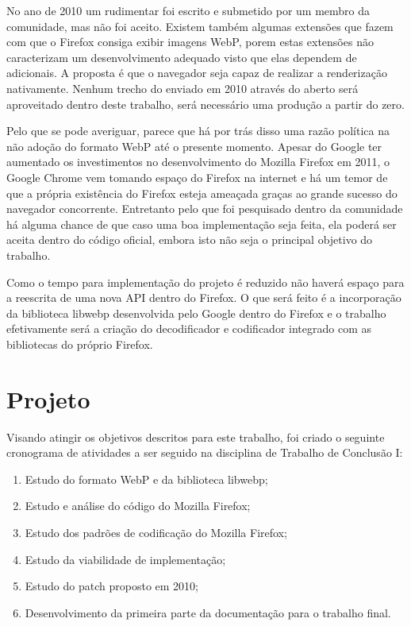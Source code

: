 \documentclass[espaco=simples,appendix=Name]{abnt}
\begin{document}
No ano de 2010 um  rudimentar foi escrito e submetido por um membro da comunidade, mas não foi aceito. Existem também algumas extensões que fazem com que o Firefox consiga exibir imagens WebP, porem estas extensões não caracterizam um desenvolvimento adequado visto que elas dependem de  adicionais. A proposta é que o navegador seja capaz de realizar a renderização nativamente. Nenhum trecho do  enviado em 2010 através do  aberto será aproveitado dentro deste trabalho, será necessário uma produção a partir do zero.

Pelo que se pode averiguar, parece que há por trás disso uma razão política na não adoção do formato WebP até o presente momento. Apesar do Google ter aumentado os investimentos no desenvolvimento do Mozilla Firefox em 2011, o Google Chrome vem tomando espaço do Firefox na internet e há um temor de que a própria existência do Firefox esteja ameaçada graças ao grande sucesso do navegador concorrente. Entretanto pelo que foi pesquisado dentro da comunidade há alguma chance de que caso uma boa implementação seja feita, ela poderá ser aceita dentro do código oficial, embora isto não seja o principal objetivo do trabalho.

Como o tempo para implementação do projeto é reduzido não haverá espaço para a reescrita de uma nova API dentro do Firefox. O que será feito é a incorporação da biblioteca libwebp desenvolvida pelo Google dentro do Firefox e o trabalho efetivamente será a criação do decodificador e codificador integrado com as bibliotecas do próprio Firefox.

\section{Projeto}

Visando atingir os objetivos descritos para este trabalho, foi criado o seguinte cronograma de atividades a ser seguido na disciplina de Trabalho de Conclusão I:
\begin{enumerate}
	\item Estudo do formato WebP e da biblioteca libwebp;
	\item Estudo e análise do código do Mozilla Firefox;
	\item Estudo dos padrões de codificação do Mozilla Firefox;
	\item Estudo da viabilidade de implementação;
	\item Estudo do patch proposto em 2010;
	\item Desenvolvimento da primeira parte da documentação para o trabalho final.
\end{enumerate}	
		
\end{document}
